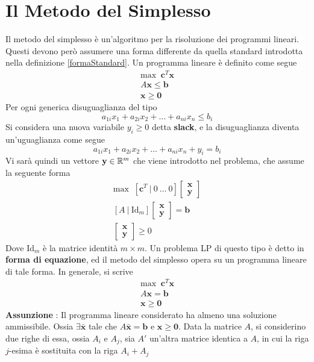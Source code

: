\documentclass[10pt, letterpaper]{report}
\begin{document}
\section{Il Metodo del Simplesso}
Il metodo del simplesso è un'algoritmo per la risoluzione dei programmi lineari. Questi devono però assumere una forma differente da quella standard introdotta nella definizione \ref{formaStandard}. Un programma lineare è definito come segue 
$$
    \begin{matrix}
        \text{max } \ \mathbf c^T\mathbf x\\ 
        A\mathbf x \le \mathbf b\\ 
        \mathbf x \ge \mathbf  0
    \end{matrix}
    $$
Per ogni generica disuguaglianza del tipo 
$$ a_{1i}x_1+a_{2i}x_2+\dots + a_{ni}x_n\le b_i$$
Si considera una nuova variabile $y_i\ge 0$ detta \textbf{slack}, e la disuguaglianza diventa un'uguaglianza come segue 
$$ a_{1i}x_1+a_{2i}x_2+\dots + a_{ni}x_n+y_i = b_i$$
Vi sarà quindi un vettore $\mathbf y \in {\mathbb R}^m$ che viene introdotto nel problema, che assume la seguente forma 
$$
    \begin{matrix}
        \text{max } \ [\mathbf c^T \ | \ 0 \ \dots \  0]\begin{bmatrix}
            \mathbf x \\\mathbf y
        \end{bmatrix}\\ 
        [A \ | \ \text{Id}_m]\begin{bmatrix}
            \mathbf x \\ \mathbf y
        \end{bmatrix} = \mathbf b\\ 
        \begin{bmatrix}
            \mathbf x \\ \mathbf y
        \end{bmatrix} \ge 0
    \end{matrix}
    $$
Dove Id$_m$ è la matrice identità $m\times m$. Un problema LP di questo tipo è detto in \textbf{forma di equazione}, ed il metodo del simplesso opera su un programma lineare di tale forma. In generale, si scrive 
$$
    \begin{matrix}
        \text{max } \ \mathbf c^T\mathbf x\\ 
        A\mathbf x = \mathbf b\\ 
        \mathbf x \ge \mathbf  0
    \end{matrix}
    $$
\textbf{Assunzione} : Il programma lineare considerato ha almeno una soluzione ammissibile. Ossia $\exists \bar{\mathbf x}$ tale che $A\bar{\mathbf x}=\mathbf b$ e $\mathbf x \ge \mathbf  0$. Data la matrice $A$, si considerino due righe di essa, ossia $A_i$ e $A_j$, sia $A'$ un'altra matrice identica a $A$, in cui la riga $j$-esima è sostituita con la riga $A_i+A_j$
\end{document}
